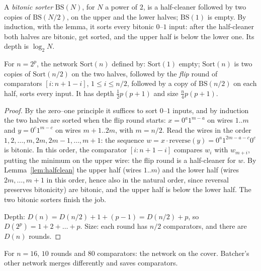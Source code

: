 A \emph{bitonic sorter} $\mathrm{BS}(N)$, for $N$ a power of $2$, is a half-cleaner followed by two copies of $\mathrm{BS}(N/2)$, on the upper and the lower halves; $\mathrm{BS}(1)$ is empty.
By induction, with the lemma, it sorts every bitonic $0$--$1$ input: after the half-cleaner both halves are bitonic, get sorted, and the upper half is below the lower one. Its depth
is $\log_2N$.

\begin{theorem}[Batcher, 1968]\label{thm:bitonic}
For $n=2^p$, the network $\mathrm{Sort}(n)$ defined by: $\mathrm{Sort}(1)$ empty; $\mathrm{Sort}(n)$ is two copies of $\mathrm{Sort}(n/2)$ on the two halves, followed by the \emph{flip}
round of comparators $[i:n+1-i]$, $1\le i\le n/2$, followed by a copy of $\mathrm{BS}(n/2)$ on each half, sorts every input. It has depth $\frac12p(p+1)$ and size $\frac n4p(p+1)$.
\end{theorem}
\begin{proof}
By the zero--one principle it suffices to sort $0$--$1$ inputs, and by induction the two halves are sorted when the flip round starts: $x=0^a1^{m-a}$ on wires $1..m$ and
$y=0^c1^{m-c}$ on wires $m+1..2m$, with $m=n/2$. Read the wires in the order $1,2,\dots,m,2m,2m-1,\dots,m+1$: the sequence $w=x\cdot\mathrm{reverse}(y)=0^a1^{2m-a-c}0^c$ is bitonic.
In this order, the comparator $[i:n+1-i]$ compares $w_i$ with $w_{m+i}$, putting the minimum on the upper wire: the flip round is a half-cleaner for $w$. By Lemma~\ref{lem:halfclean}
the upper half (wires $1..m$) and the lower half (wires $2m,\dots,m+1$ in this order, hence also in the natural order, since reversal preserves bitonicity) are bitonic, and
the upper half is below the lower half. The two bitonic sorters finish the job.

Depth: $D(n)=D(n/2)+1+(p-1)=D(n/2)+p$, so $D(2^p)=1+2+\dots+p$. Size: each round has $n/2$ comparators, and there are $D(n)$ rounds.
\end{proof}

For $n=16$, $10$ rounds and $80$ comparators: the network on the cover. Batcher's other network merges differently and saves comparators.


